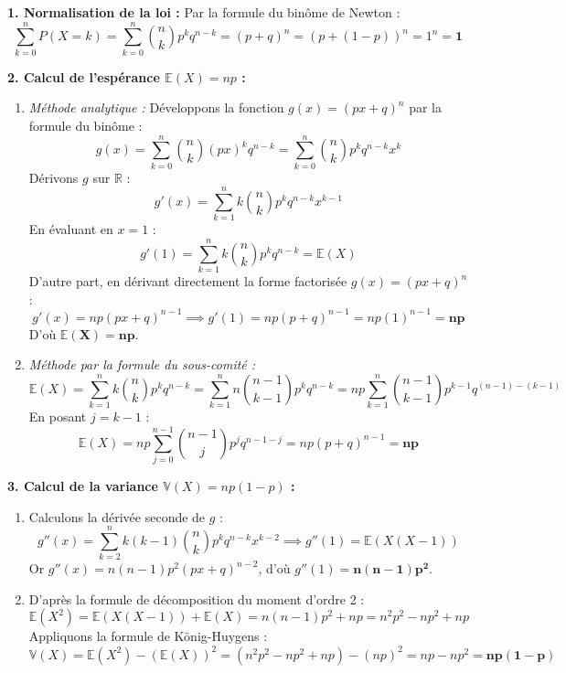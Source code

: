 \documentclass[11pt,a4paper]{article}
\newcommand{\R}{\mathbb{R}}
\newcommand{\E}{\mathbb{E}}
\newcommand{\V}{\mathbb{V}}
\begin{document}
\begin{correctionbox}
\textbf{1. Normalisation de la loi :}
Par la formule du binôme de Newton :
\[
\sum_{k=0}^n P(X = k) = \sum_{k=0}^n \binom{n}{k} p^k q^{n-k} = (p + q)^n = (p + (1 - p))^n = 1^n = \mathbf{1}
\]

\textbf{2. Calcul de l'espérance $\E(X) = np$ :}
\begin{enumerate}[label=(\alph*)]
    \item \emph{Méthode analytique :} Développons la fonction $g(x) = (px + q)^n$ par la formule du binôme :
    \[
    g(x) = \sum_{k=0}^n \binom{n}{k} (px)^k q^{n-k} = \sum_{k=0}^n \binom{n}{k} p^k q^{n-k} x^k
    \]
    Dérivons $g$ sur $\R$ :
    \[
    g'(x) = \sum_{k=1}^n k \binom{n}{k} p^k q^{n-k} x^{k-1}
    \]
    En évaluant en $x = 1$ :
    \[
    g'(1) = \sum_{k=1}^n k \binom{n}{k} p^k q^{n-k} = \E(X)
    \]
    D'autre part, en dérivant directement la forme factorisée $g(x) = (px + q)^n$ :
    \[
    g'(x) = n p (px + q)^{n-1} \implies g'(1) = n p (p + q)^{n-1} = n p (1)^{n-1} = \mathbf{np}
    \]
    D'où $\mathbf{\E(X) = np}$.
    \item \emph{Méthode par la formule du sous-comité :}
    \[
    \E(X) = \sum_{k=1}^n k \binom{n}{k} p^k q^{n-k} = \sum_{k=1}^n n \binom{n-1}{k-1} p^k q^{n-k} = n p \sum_{k=1}^n \binom{n-1}{k-1} p^{k-1} q^{(n-1)-(k-1)}
    \]
    En posant $j = k - 1$ :
    \[
    \E(X) = n p \sum_{j=0}^{n-1} \binom{n-1}{j} p^j q^{n-1-j} = n p (p + q)^{n-1} = \mathbf{np}
    \]
\end{enumerate}

\textbf{3. Calcul de la variance $\V(X) = np(1-p)$ :}
\begin{enumerate}[label=(\alph*)]
    \item Calculons la dérivée seconde de $g$ :
    \[
    g''(x) = \sum_{k=2}^n k(k-1) \binom{n}{k} p^k q^{n-k} x^{k-2} \implies g''(1) = \E(X(X-1))
    \]
    Or $g''(x) = n(n-1)p^2 (px + q)^{n-2}$, d'où $g''(1) = \mathbf{n(n-1)p^2}$.
    \item D'après la formule de décomposition du moment d'ordre 2 :
    \[
    \E(X^2) = \E(X(X-1)) + \E(X) = n(n-1)p^2 + np = n^2 p^2 - np^2 + np
    \]
    Appliquons la formule de König-Huygens :
    \[
    \V(X) = \E(X^2) - (\E(X))^2 = (n^2 p^2 - np^2 + np) - (np)^2 = np - np^2 = \mathbf{np(1-p)}
    \]
\end{enumerate}
\end{correctionbox}
\end{document}

